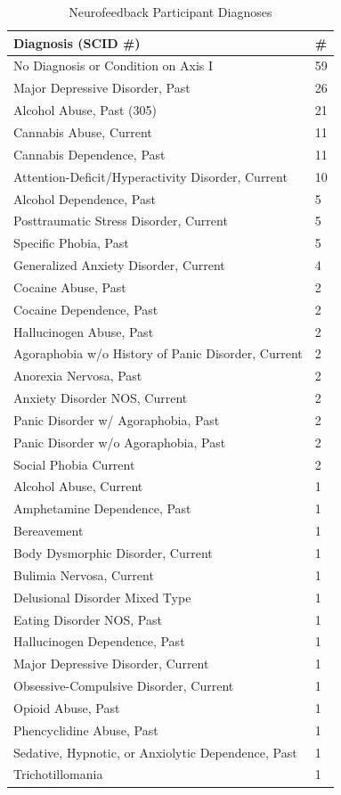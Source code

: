 \begin{table}[h!]
\caption{Neurofeedback Participant Diagnoses}
      \begin{tabular}{ p{7cm} p{0.4cm} }
        \textbf{Diagnosis (SCID \#)} & \textbf{\#} \\ \hline
        No Diagnosis or Condition on Axis I & 59  \\
        Major Depressive Disorder, Past & 26  \\
        Alcohol Abuse, Past (305) & 21  \\
        Cannabis Abuse, Current & 11  \\
        Cannabis Dependence, Past & 11  \\
        Attention-Deficit/Hyperactivity Disorder, Current & 10  \\
        Alcohol Dependence, Past & 5  \\
        Posttraumatic Stress Disorder, Current & 5  \\
        Specific Phobia, Past & 5  \\
        Generalized Anxiety Disorder, Current & 4  \\
        Cocaine Abuse, Past & 2  \\
        Cocaine Dependence, Past & 2  \\
        Hallucinogen Abuse, Past & 2  \\
        Agoraphobia w/o History of Panic Disorder, Current & 2  \\
        Anorexia Nervosa, Past & 2  \\
        Anxiety Disorder NOS, Current & 2  \\
        Panic Disorder w/ Agoraphobia, Past & 2  \\
        Panic Disorder w/o Agoraphobia, Past & 2  \\
        Social Phobia Current & 2  \\
        Alcohol Abuse, Current & 1  \\
        Amphetamine Dependence, Past & 1  \\
        Bereavement & 1  \\
        Body Dysmorphic Disorder, Current & 1  \\
        Bulimia Nervosa, Current & 1  \\
        Delusional Disorder Mixed Type & 1  \\
        Eating Disorder NOS, Past & 1  \\
        Hallucinogen Dependence, Past & 1  \\
        Major Depressive Disorder, Current & 1  \\
        Obsessive-Compulsive Disorder, Current & 1  \\
        Opioid Abuse, Past  & 1  \\
        Phencyclidine Abuse, Past & 1  \\
        Sedative, Hypnotic, or Anxiolytic Dependence, Past & 1 \\
        Trichotillomania & 1  \\
        \hline
      \end{tabular}
\label{psych}
\end{table}


